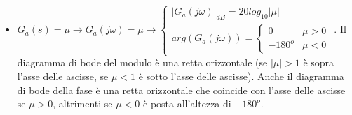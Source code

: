 \begin{itemize}
    \item $G_a(s) = \mu \rightarrow  G_a(j \omega) = \mu \rightarrow \begin{cases}
        |G_a(j \omega)|_{dB} = 20 log_10|\mu|\\
        arg(G_a(j \omega)) = \begin{cases}
            0 \;\;\; & \mu>0\\
            -180^o & \mu<0
        \end{cases}
    \end{cases}$.\newline
    Il diagramma di bode del modulo è una retta orizzontale (se $|\mu| > 1$ è sopra l'asse delle ascisse, se $\mu < 1$ è sotto l'asse delle ascisse).\newline
Anche il diagramma di bode della fase è una retta orizzontale che coincide con l'asse delle ascisse se $\mu>0$, altrimenti se $\mu<0$ è posta all'altezza di $-180^o$.
\end{itemize}